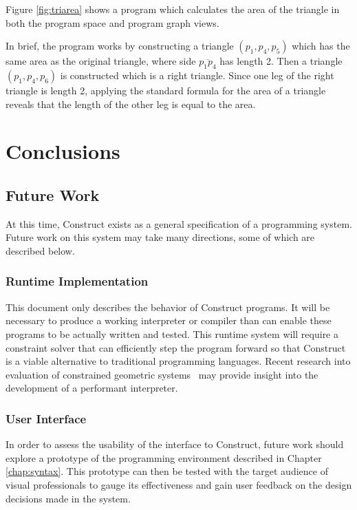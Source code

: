 \documentclass[twoside,openright,11pt]{report}
\begin{document}
Figure \ref{fig:triarea} shows a program which calculates the area of the triangle in both the program space and program graph views.

In brief, the program works by constructing a triangle $(p_1,p_4,p_5)$ which has the same area as the original triangle, where side $\overline{p_1p_4}$ has length 2.
Then a triangle $(p_1,p_4,p_6)$ is constructed which is a right triangle. 
Since one leg of the right triangle is length 2, applying the standard formula for the area of a triangle reveals that the length of the other leg is equal to the area.

\chapter{Conclusions}
\label{chap:conclusions}

\section{Future Work}
\label{sec:future}

At this time, Construct exists as a general specification of a programming system. 
Future work on this system may take many directions, some of which are described below.

\subsection{Runtime Implementation}

This document only describes the behavior of Construct programs. 
It will be necessary to produce a working interpreter or compiler than can enable these programs to be actually written and tested. 
This runtime system will require a constraint solver that can efficiently step the program forward so that Construct is a viable alternative to traditional programming languages. 
Recent research into evaluation of constrained geometric systems~\cite{alberti2001objsa,freixas2010constraint,pion2006lazy} may provide insight into the development of a performant interpreter.

\subsection{User Interface}

In order to assess the usability of the interface to Construct, future work should explore a prototype of the programming environment described in Chapter \ref{chap:syntax}.
This prototype can then be tested with the target audience of visual professionals to gauge its effectiveness and gain user feedback on the design decisions made in the system.
\end{document}
